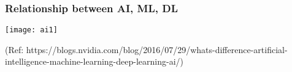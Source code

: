 \begin{frame}[fragile]\frametitle{Relationship between AI, ML, DL}
\begin{center}
\texttt{[image: ai1]}
\end{center}
{\tiny (Ref: https://blogs.nvidia.com/blog/2016/07/29/whats-difference-artificial-intelligence-machine-learning-deep-learning-ai/)}
\end{frame}










